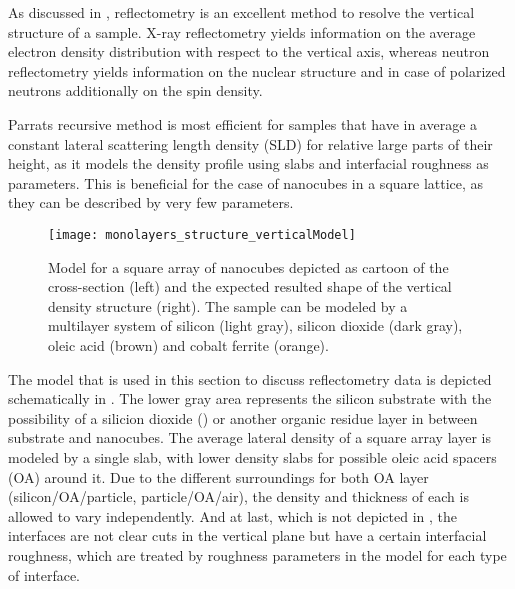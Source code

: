 \documentclass[\main/dresen_thesis.tex]{subfiles}
\begin{document}
  \label{sec:monolayers:structure:verticalModel}
  As discussed in , reflectometry is an excellent method to resolve the vertical structure of a sample.
  X-ray reflectometry yields information on the average electron density distribution with respect to the vertical axis, whereas neutron reflectometry yields information on the nuclear structure and in case of polarized neutrons additionally on the spin density.

  Parrats recursive method is most efficient for samples that have in average a constant lateral scattering length density (SLD) for relative large parts of their height, as it models the density profile using slabs and interfacial roughness as parameters.
  This is beneficial for the case of nanocubes in a square lattice, as they can be described by very few parameters.

  \begin{figure}[tb]
    \centering
    \texttt{[image: monolayers\_structure\_verticalModel]}
    \caption{\label{fig:monolayers:structure:verticalModel}Model for a square array of nanocubes depicted as cartoon of the cross-section (left) and the expected resulted shape of the vertical density structure (right). The sample can be modeled by a multilayer system of silicon (light gray), silicon dioxide (dark gray), oleic acid (brown) and cobalt ferrite (orange). }
  \end{figure}

  The model that is used in this section to discuss reflectometry data is depicted schematically in .
  The lower gray area represents the silicon substrate with the possibility of a silicion dioxide () or another organic residue layer in between substrate and nanocubes.
  The average lateral density of a square array layer is modeled by a single slab, with lower density slabs for possible oleic acid spacers (OA) around it.
  Due to the different surroundings for both OA layer (silicon/OA/particle, particle/OA/air), the density and thickness of each is allowed to vary independently.
  And at last, which is not depicted in , the interfaces are not clear cuts in the vertical plane but have a certain interfacial roughness, which are treated by roughness parameters in the model for each type of interface.
\end{document}
